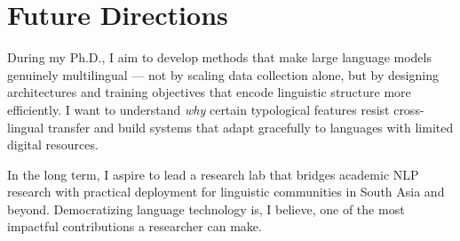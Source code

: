   \section{Future Directions}

  During my Ph.D., I aim to develop methods that make large language models genuinely multilingual — not by scaling data collection alone, but by designing architectures and training objectives that encode linguistic structure more efficiently. I want to understand \textit{why} certain typological features resist cross-lingual transfer and build systems that adapt gracefully to languages with limited digital resources.

  In the long term, I aspire to lead a research lab that bridges academic NLP research with practical deployment for linguistic communities in South Asia and beyond. Democratizing language technology is, I believe, one of the most impactful contributions a researcher can make.

